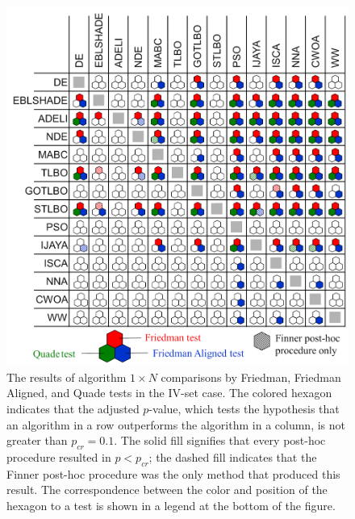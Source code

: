 \documentclass[a4paper,fleqn]{cas-dc}
\begin{document}
\begin{figure}[]
	\centering
		\includegraphics[width=1.0\columnwidth]{N1Tresult}
	  \caption{The results of algorithm $1\times N$ comparisons by Friedman, Friedman Aligned, and Quade tests in the IV-set case.
               The colored hexagon indicates that the adjusted $p$-value,
               which tests the hypothesis that an algorithm in a row outperforms the algorithm in a column,
               is not greater than $p_{cr}=0.1$.
               The solid fill signifies that every post-hoc procedure resulted in $p<p_{cr}$;
               the dashed fill indicates that the Finner post-hoc procedure was the only method that produced this result.
               The correspondence between the color and position of the hexagon to a test
               is shown in a legend at the bottom of the figure.
               }\label{figN1RezIVset}
\end{figure}
\end{document}
